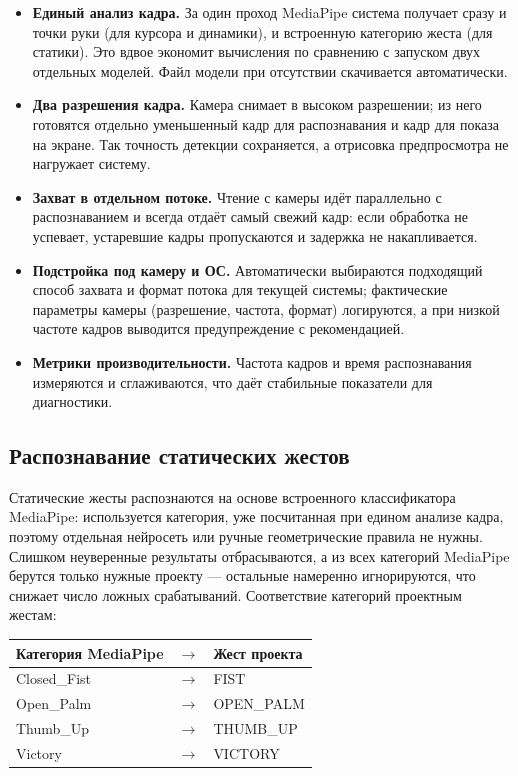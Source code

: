 \documentclass[11pt,a4paper]{article}
\begin{document}
\begin{itemize}[leftmargin=1.4em]
  \item \textbf{Единый анализ кадра.} За один проход MediaPipe система получает сразу и точки
        руки (для курсора и динамики), и встроенную категорию жеста (для статики). Это
        вдвое экономит вычисления по сравнению с запуском двух отдельных моделей. Файл модели при
        отсутствии скачивается автоматически.
  \item \textbf{Два разрешения кадра.} Камера снимает в высоком разрешении; из него готовятся
        отдельно уменьшенный кадр для распознавания и кадр для показа на экране. Так точность
        детекции сохраняется, а отрисовка предпросмотра не нагружает систему.
  \item \textbf{Захват в отдельном потоке.} Чтение с камеры идёт параллельно с распознаванием и
        всегда отдаёт самый свежий кадр: если обработка не успевает, устаревшие кадры
        пропускаются и задержка не накапливается.
  \item \textbf{Подстройка под камеру и ОС.} Автоматически выбираются подходящий способ захвата и
        формат потока для текущей системы; фактические параметры камеры (разрешение, частота,
        формат) логируются, а при низкой частоте кадров выводится предупреждение с рекомендацией.
  \item \textbf{Метрики производительности.} Частота кадров и время распознавания измеряются и
        сглаживаются, что даёт стабильные показатели для диагностики.
\end{itemize}

\subsection{Распознавание статических жестов}

Статические жесты распознаются на основе встроенного классификатора MediaPipe: используется
категория, уже посчитанная при едином анализе кадра, поэтому отдельная нейросеть или ручные
геометрические правила не нужны. Слишком неуверенные результаты отбрасываются, а из всех
категорий MediaPipe берутся только нужные проекту — остальные намеренно игнорируются, что
снижает число ложных срабатываний. Соответствие категорий проектным жестам:

\begin{center}
\begin{tabular}{>{\ttfamily}l c >{\ttfamily}l}
\toprule
\normalfont\textbf{Категория MediaPipe} & $\rightarrow$ & \normalfont\textbf{Жест проекта} \\
\midrule
Closed\_Fist & $\rightarrow$ & FIST \\
Open\_Palm   & $\rightarrow$ & OPEN\_PALM \\
Thumb\_Up    & $\rightarrow$ & THUMB\_UP \\
Victory      & $\rightarrow$ & VICTORY \\
\bottomrule
\end{tabular}
\end{center}
\end{document}
